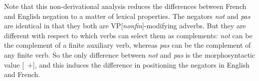 \documentclass[output=paper
                ,modfonts
                ,nonflat
	        ,collection
	        ,collectionchapter
	        ,collectiontoclongg
 	        ,biblatex
                ,babelshorthands
                ,newtxmath
                ,draftmode
                ,colorlinks, citecolor=brown
]{./langsci/langscibook}
\begin{document}
{\begin{exe}
\begin{xlist}
\begin{exe}
\begin{xlist}
\eal
{}
\zl

\eal
{}
\zl

Note that this non-derivational analysis reduces the differences between
French and English negation to a matter of lexical properties.
The negators \textit{not} and \textit{pas} are identical in that they both are
VP[\textit{nonfin}]-modifying adverbs. But they are different with respect to
which verbs can select them as complements:  \textit{not} can be the
complement of a finite auxiliary verb, whereas \textit{pas} can be the
complement of any finite verb.  So the only difference between \emph{not}
and \emph{pas} is the morphosyntactic value [\AUX\ $+$], and this induces
the difference in positioning the negators in English and French.



%





\end{xlist}
\end{exe}
\end{xlist}
\end{exe}}
\end{document}
